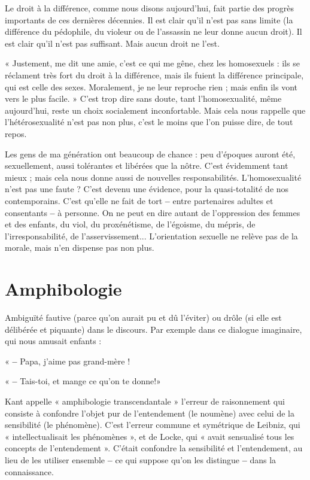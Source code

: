 Le droit à la différence, comme nous disons aujourd’hui, fait partie des progrès
importants de ces dernières décennies. Il est clair qu’il n’est pas sans limite
(la différence du pédophile, du violeur ou de l’assassin ne leur donne aucun
droit). Il est clair qu’il n’est pas suffisant. Mais aucun droit ne l’est.

« Justement, me dit une amie, c’est ce qui me gêne, chez les homosexuels :
ils se réclament très fort du droit à la différence, mais ils fuient la différence
principale, qui est celle des sexes. Moralement, je ne leur reproche rien ; mais
enfin ils vont vers le plus facile. » C’est trop dire sans doute, tant l’homosexualité,
même aujourd’hui, reste un choix socialement inconfortable. Mais
cela nous rappelle que l’hétérosexualité n’est pas non plus, c’est le moins que
l’on puisse dire, de tout repos.

Les gens de ma génération ont beaucoup de chance : peu d’époques auront
été, sexuellement, aussi tolérantes et libérées que la nôtre. C’est évidemment
tant mieux ; mais cela nous donne aussi de nouvelles responsabilités. L’homosexualité
n’est pas une faute ? C’est devenu une évidence, pour la quasi-totalité
de nos contemporains. C’est qu’elle ne fait de tort {\bf --} entre partenaires adultes et
consentants {\bf --} à personne. On ne peut en dire autant de l'oppression des
femmes et des enfants, du viol, du proxénétisme, de l’égoisme, du mépris, de
l’irresponsabilité, de l’asservissement... L'orientation sexuelle ne relève pas de
la morale, mais n’en dispense pas non plus.

\section{Amphibologie}
Ambiguïté fautive (parce qu’on aurait pu et dû l’éviter) ou
drôle (si elle est délibérée et piquante) dans le discours.
Par exemple dans ce dialogue imaginaire, qui nous amusait enfants :

« {\bf --} Papa, j'aime pas grand-mère !

« {\bf --} Tais-toi, et mange ce qu’on te donne!»

Kant appelle « amphibologie transcendantale » l'erreur de raisonnement
qui consiste à confondre l’objet pur de l’entendement (le noumène) avec celui
de la sensibilité (le phénomène). C’est l’erreur commune et symétrique de Leibniz,
qui « intellectualisait les phénomènes », et de Locke, qui « avait sensualisé
tous les concepts de l’entendement ». C’était confondre la sensibilité et l’entendement,
au lieu de les utiliser ensemble {\bf --} ce qui suppose qu’on les distingue {\bf --}
dans la connaissance.

